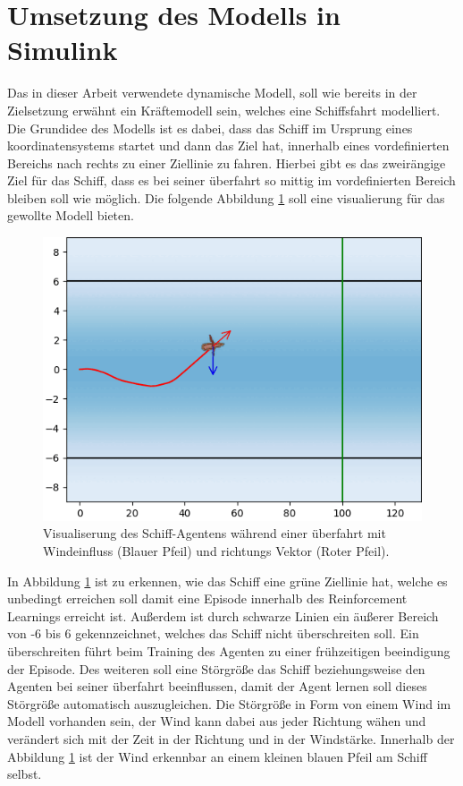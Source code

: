 \documentclass[]{iat}
\begin{document}
\section{Umsetzung des Modells in Simulink} \label{sec:imp_simulink}
Das in dieser Arbeit verwendete dynamische Modell, soll wie bereits in der Zielsetzung erwähnt ein Kräftemodell sein, welches eine Schiffsfahrt modelliert. Die Grundidee des Modells ist es dabei, dass das Schiff im Ursprung eines koordinatensystems startet und dann das Ziel hat, innerhalb eines vordefinierten Bereichs nach rechts zu einer Ziellinie zu fahren. Hierbei gibt es das zweirängige Ziel für das Schiff, dass es bei seiner überfahrt so mittig im vordefinierten Bereich bleiben soll wie möglich. Die folgende Abbildung \ref*{abb:boat_frame_example_2} soll eine visualierung für das gewollte Modell bieten.
\begin{figure}[H]
    \includegraphics[width=\textwidth]{graphics/boat_frame_example_2.png}
    \centering
    \caption{Visualiserung des Schiff-Agentens während einer überfahrt mit Windeinfluss (Blauer Pfeil) und richtungs Vektor (Roter Pfeil).}
    \label{abb:boat_frame_example_2}
\end{figure}
In Abbildung \ref*{abb:boat_frame_example_2} ist zu erkennen, wie das Schiff eine grüne Ziellinie hat, welche es unbedingt erreichen soll damit eine Episode innerhalb des Reinforcement Learnings erreicht ist. Außerdem ist durch schwarze Linien ein äußerer Bereich von -6 bis 6 gekennzeichnet, welches das Schiff nicht überschreiten soll. Ein überschreiten führt beim Training des Agenten zu einer frühzeitigen beeindigung der Episode. Des weiteren soll eine Störgröße das Schiff beziehungsweise den Agenten bei seiner überfahrt beeinflussen, damit der Agent lernen soll dieses Störgröße automatisch auszugleichen. Die Störgröße in Form von einem Wind im Modell vorhanden sein, der Wind kann dabei aus jeder Richtung wähen und verändert sich mit der Zeit in der Richtung und in der Windstärke. Innerhalb der Abbildung \ref*{abb:boat_frame_example_2} ist der Wind erkennbar an einem kleinen blauen Pfeil am Schiff selbst.\\
\end{document}
